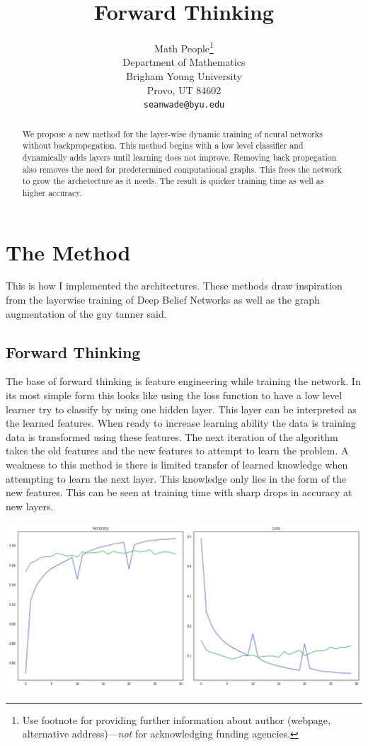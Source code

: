 \documentclass{article}
\title{Forward Thinking}
\author{
  Math People\thanks{Use footnote for providing further
    information about author (webpage, alternative
    address)---\emph{not} for acknowledging funding agencies.} \\
  Department of Mathematics\\
  Brigham Young University\\
  Provo, UT 84602\\
  \texttt{seanwade@byu.edu} \\
}
\begin{document}

\maketitle

\begin{abstract}
  We propose a new method for the layer-wise dynamic training of neural networks without backpropegation. This method begins with a low level classifier and dynamically adds layers until learning does not improve. Removing back propegation also removes the need for predetermined computational graphs. This frees the network to grow the archetecture as it needs. The result is quicker training time as well as higher accuracy.
\end{abstract}

\section{The Method}

This is how I implemented the architectures. These methods draw inspiration from the layerwise training of Deep Belief Networks as well as the graph augmentation of the guy tanner said.

\subsection{Forward Thinking}

The base of forward thinking is feature engineering while training the network. In its most simple form this looks like using the loss function to have a low level learner try to classify by using one hidden layer. This layer can be interpreted as the learned features. When ready to increase learning ability the data is training data is transformed using these features. The next iteration of the algorithm takes the old features and the new features to attempt to learn the problem. A weakness to this method is there is limited transfer of learned knowledge when attempting to learn the next layer. This knowledge only lies in the form of the new features. This can be seen at training time with sharp drops in accuracy at new layers.

\begin{center}
\includegraphics[scale=.25]{acc-loss-forward-thinking}
\end{center}
\end{document}
